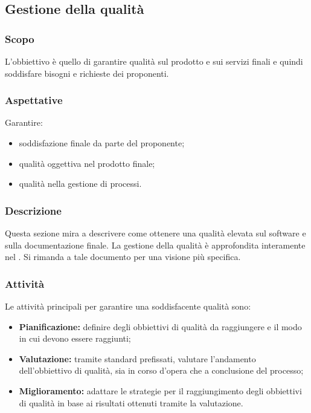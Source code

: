 \subsection{Gestione della qualità}\label{3.3}

\subsubsection{Scopo}\label{3.3.1}
L'obbiettivo è quello di garantire qualità sul prodotto e sui servizi finali e quindi soddisfare bisogni e richieste dei proponenti.

\subsubsection{Aspettative}
Garantire:
\begin{itemize}
	\item soddisfazione finale da parte del proponente;
	\item qualità oggettiva nel prodotto finale;
	\item qualità nella gestione di processi.
\end{itemize}

\subsubsection{Descrizione}
Questa sezione mira a descrivere come ottenere una qualità elevata sul software e sulla documentazione finale.
La gestione della qualità è approfondita interamente nel . Si rimanda a tale documento per una visione più specifica.

\subsubsection{Attività}
Le attività principali per garantire una soddisfacente qualità sono:
\begin{itemize}
	\item \textbf{Pianificazione:} definire degli obbiettivi di qualità da raggiungere e il modo in cui devono essere raggiunti;
	\item \textbf{Valutazione:} tramite standard prefissati, valutare l'andamento dell'obbiettivo di qualità, sia in corso d'opera che a conclusione del processo;
	\item \textbf{Miglioramento:} adattare le strategie per il raggiungimento degli obbiettivi di qualità in base ai risultati ottenuti tramite la valutazione.
\end{itemize}

